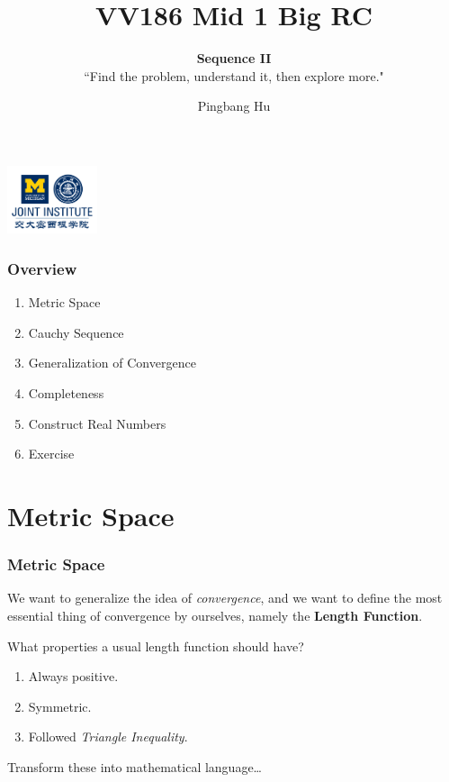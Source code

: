 \documentclass[12pt, t]{beamer}
\title{VV186 Mid 1 Big RC}
\subtitle{\textbf{Sequence II}\\``Find the problem, understand it, then explore more."}
\institute[UM-SJTU JI]{University of Michigan-Shanghai Jiao Tong University Joint Institute}
\author{Pingbang Hu}
\renewcommand{\emph}[1]{{\color{Turquoise3}\textsl{#1}}}
\begin{document}
\begin{frame}
    \titlepage
    \begin{center}
        \includegraphics[height=2cm]{Figures/logo/logo2.png}
    \end{center}
\end{frame}

\begin{frame}
    \frametitle{Overview}
    \begin{enumerate}
        \item Metric Space
        \item Cauchy Sequence
        \item Generalization of Convergence
        \item Completeness
        \item Construct Real Numbers
        \item Exercise
    \end{enumerate}
\end{frame}


\section{Metric Space}
\begin{frame}
    \frametitle{Metric Space}
We want to generalize the idea of \emph{convergence}, and we want to define the most essential thing of convergence by ourselves, 
namely the \textbf{Length Function}.\\

\vspace{1em}

What properties a usual length function should have?
\begin{enumerate}
    \item Always positive.
    \item Symmetric.
    \item Followed \emph{Triangle Inequality}.
\end{enumerate}

\vspace{1em}

Transform these into mathematical language\dots
\end{frame}
\end{document}
